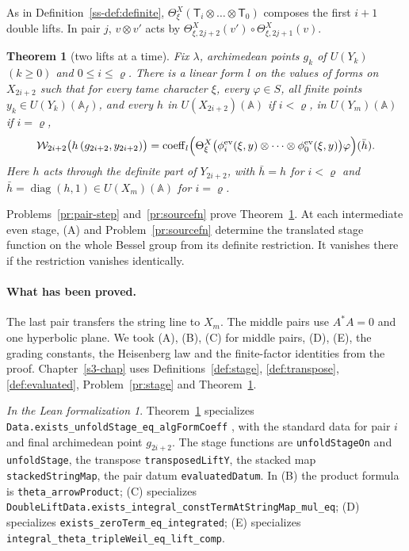 \documentclass[reqno]{amsart}
\newcounter{chap}
\theoremstyle{definition}
\theoremstyle{plain}
\newtheorem{theorem}{Theorem}[section]
\theoremstyle{remark}
\newtheorem*{leanremark}{In the Lean formalization}
\newcommand{\A}{\mathbb{A}}
\newcommand{\Wc}{\mathcal{W}}
\newcommand{\ev}{\mathrm{ev}}
\newcommand{\coeff}{\operatorname{coeff}}
\newcommand{\diag}{\operatorname{diag}}
\newcommand{\tl}[1]{\texttt{#1}}
\begin{document}
As in Definition~\ref{ss-def:definite}, \(\Theta^X_\xi(\mathsf T_i\otimes\dots\otimes\mathsf T_0)\) composes the first \(i+1\) double lifts.  In pair \(j\), \(v\otimes v'\) acts by \(\Theta^X_{\xi,2j+2}(v')\circ\Theta^X_{\xi,2j+1}(v)\).

\begin{theorem}[two lifts at a time]\label{thm:two-lifts}
Fix \(\lambda\), archimedean points \(g_k\) of \(U(Y_k)\) \((k \ge 0)\) and \(0 \le i \le \varrho\).  There is a linear form \(l\) on the values of forms on \(X_{2i+2}\) such that for every tame character \(\xi\), every \(\varphi \in S\), all finite points \(y_k \in U(Y_k)(\A_f)\), and every \(h\) in \(U(X_{2i+2})(\A)\) if \(i < \varrho\), in \(U(Y_m)(\A)\) if \(i = \varrho\),
\[
  \Wc_{2i+2}\bigl(h\,(g_{2i+2}, y_{2i+2})\bigr) = \coeff_l\Bigl(\Theta^X_\xi\bigl(\phi^{\ev}_i(\xi, y) \otimes \dots \otimes \phi^{\ev}_0(\xi, y)\bigr)\varphi\Bigr)(\bar h) .
\]
Here \(h\) acts through the definite part of \(Y_{2i+2}\), with \(\bar h=h\) for \(i<\varrho\) and \(\bar h=\diag(h,1)\in U(X_m)(\A)\) for \(i=\varrho\).
\end{theorem}

Problems~\ref{pr:pair-step} and~\ref{pr:sourcefn} prove Theorem~\ref{thm:two-lifts}.  At each intermediate even stage, (A) and Problem~\ref{pr:sourcefn} determine the translated stage function on the whole Bessel group from its definite restriction.  It vanishes there if the restriction vanishes identically.

\paragraph{What has been proved.}  The last pair transfers the string line to \(X_m\).  The middle pairs use \(A^*A=0\) and one hyperbolic plane.  We took (A), (B), (C) for middle pairs, (D), (E), the grading constants, the Heisenberg law and the finite-factor identities from the proof.  Chapter~\ref{s3-chap} uses Definitions~\ref{def:stage}, \ref{def:transpose}, \ref{def:evaluated}, Problem~\ref{pr:stage} and Theorem~\ref{thm:two-lifts}.

\begin{leanremark}
\raggedright Theorem~\ref{thm:two-lifts} specializes \tl{Data.exists\_unfoldStage\_eq\_algFormCoeff} \cite{GL}, with the standard data for pair \(i\) and final archimedean point \(g_{2i+2}\).  The stage functions are \tl{unfoldStageOn} and \tl{unfoldStage}, the transpose \tl{transposedLiftY}, the stacked map \tl{stackedStringMap}, the pair datum \tl{evaluatedDatum}.  In (B) the product formula is \tl{theta\_arrowProduct}; (C) specializes \tl{DoubleLiftData.exists\_integral\_constTermAtStringMap\_mul\_eq}; (D) specializes \tl{exists\_zeroTerm\_eq\_integrated}; (E) specializes \tl{integral\_theta\_tripleWeil\_eq\_lift\_comp}.\par
\end{leanremark}
\end{document}
